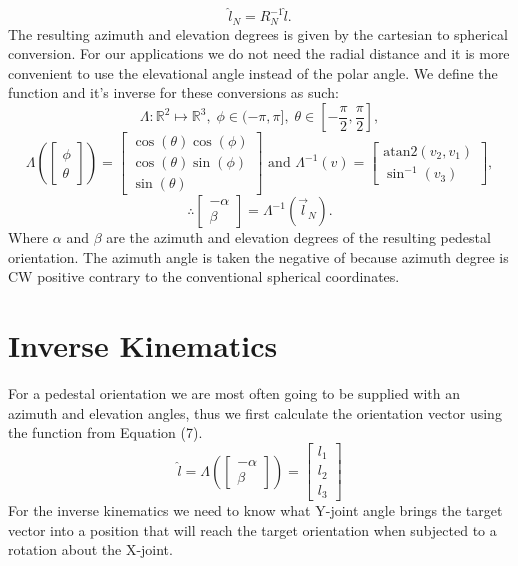 \documentclass[a4paper,onecolumn,11pt]{article}
\begin{document}
\begin{equation}
    \hat l_N = R_N^{-1} \hat l.
\end{equation}
The resulting azimuth and elevation degrees is given by the cartesian to
spherical conversion. For our applications we do not need the radial distance
and it is more convenient to use the elevational angle instead of the polar
angle. We define the function and it's inverse for these conversions as such:
\begin{equation}
    \Lambda : \mathbb{R}^2 \mapsto \mathbb{R}^3, \; 
    \phi \in (-\pi, \pi],\; 
    \theta \in \left[-\frac{\pi}{2},\frac{\pi}{2}\right],
\end{equation}
\begin{equation}
    \Lambda
    \left( \begin{bmatrix} \phi \\ \theta \end{bmatrix} \right)
    =
    \begin{bmatrix}
        \cos( \theta ) \cos(\phi) \\
        \cos( \theta ) \sin(\phi) \\
        \sin ( \theta )
    \end{bmatrix}
    \text{ and }
    \Lambda^{-1}( \hat v ) = \begin{bmatrix}
        \text{atan2}(v_2, v_1)
        \\
        \sin ^{-1} ( v_3 )
        \end{bmatrix},
\end{equation}
\begin{equation}
    \therefore \begin{bmatrix} - \alpha \\ \beta \end{bmatrix} =
        \Lambda^{-1}(\vec l_N).
\end{equation}
Where $\alpha$ and $\beta$ are the azimuth and elevation degrees of the
resulting pedestal orientation. The azimuth angle is taken the negative of
because azimuth degree is CW positive contrary to the conventional spherical
coordinates. 

\section{Inverse Kinematics}
For a pedestal orientation we are most often going to be supplied with an
azimuth and elevation angles, thus we first calculate the orientation vector
using the function from Equation (7).
\begin{equation}
    \hat l = \Lambda\left(\begin{bmatrix} - \alpha \\ \beta \end{bmatrix}\right) =
    \begin{bmatrix}
        l_{1} \\
        l_{2} \\
        l_{3}
    \end{bmatrix}
\end{equation}
For the inverse kinematics we need to know what Y-joint angle brings the
target vector into a position that will reach the target orientation when
subjected to a rotation about the X-joint.
\end{document}
